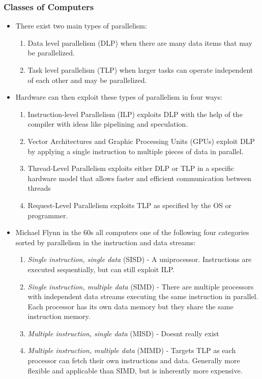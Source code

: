 \subsubsection{Classes of Computers}
\begin{itemize}
    \item There exist two main types of parallelism:
    \begin{enumerate}
        \item Data level parallelism (DLP) when there are many data items that may be parallelized.
        \item Task level parallelism (TLP) when larger tasks can operate independent of each other and may be parallelized.
    \end{enumerate}
    \item Hardware can then exploit these types of parallelism in four ways:
    \begin{enumerate}
        \item Instruction-level Parallelism (ILP) exploits DLP with the help of the compiler with ideas like pipelining and speculation.
        \item Vector Architectures and Graphic Processing Units (GPUs) exploit DLP by applying a single instruction to multiple pieces of data in parallel.
        \item Thread-Level Parallelism exploits either DLP or TLP in a specific hardware model that allows faster and efficient communication between threads
        \item Request-Level Parallelism exploits TLP as specified by the OS or programmer.
    \end{enumerate}
    \item Michael Flynn in the 60s all computers one of the following four categories sorted by parallelism in the instruction and data streams:
    \begin{enumerate}
        \item \textit{Single instruction, single data} (SISD) - A uniprocessor. Instructions are executed sequentially, but can still exploit ILP.
        \item \textit{Single instruction, multiple data} (SIMD) - There are multiple processors with independent data streams executing the same instruction in parallel. Each processor has its own data memory but they share the same instruction memory.
        \item \textit{Multiple instruction, single data} (MISD) - Doesnt really exist
        \item \textit{Multiple instruction, multiple data} (MIMD) - Targets TLP as each processor can fetch their own instructions and data. Generally more flexible and applicable than SIMD, but is inherently more expensive.
    \end{enumerate}
\end{itemize}
